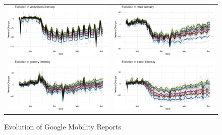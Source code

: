 \documentclass[11pt,reqno,letter]{amsart}
\theoremstyle{definition}
\begin{document}
\begin{figure}[ht]\caption{Evolution of Google Mobility Reports \label{fig:gmr}}
  \begin{minipage}{\linewidth}
    \begin{tabular}{cc}
      \includegraphics[width=0.5\linewidth]{tables_and_figures/workplaces}
      &
      \includegraphics[width=0.5\linewidth]{tables_and_figures/retail}
      \\
      \includegraphics[width=0.5\linewidth]{tables_and_figures/grocery}
      &
      \includegraphics[width=0.5\linewidth]{tables_and_figures/transit}
    \end{tabular}
  \end{minipage}
\end{figure}
\end{document}
